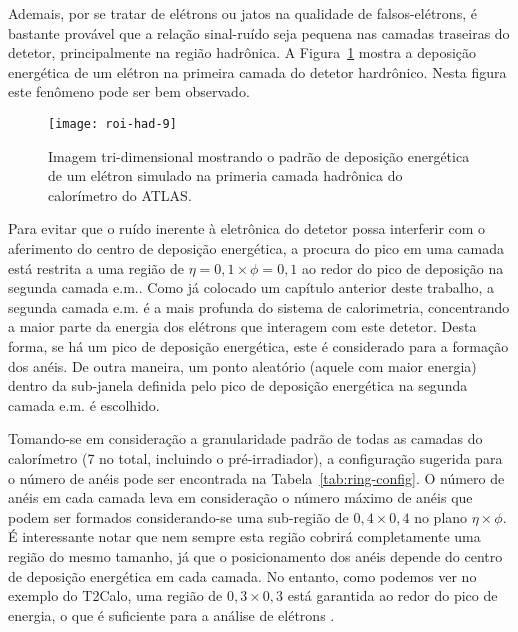 Ademais, por se tratar de elétrons ou jatos na qualidade de falsos-elétrons, é
bastante provável que a relação sinal-ruído seja pequena nas camadas traseiras
do detetor, principalmente na região hadrônica. A Figura~\ref{fig:roi-had-9}
mostra a deposição energética de um elétron na primeira camada do detetor
hardrônico. Nesta figura este fenômeno pode ser bem observado.

\begin{figure}
\begin{center}
\texttt{[image: roi-had-9]}
\end{center}
\caption{Imagem tri-dimensional mostrando o padrão de deposição energética de
um elétron simulado na primeria camada hadrônica do calorímetro do ATLAS.}
\label{fig:roi-had-9}
\end{figure}

Para evitar que o ruído inerente à eletrônica do detetor possa interferir com
o aferimento do centro de deposição energética, a procura do pico em uma
camada está restrita a uma região de $\eta=0,1\times\phi=0,1$ ao redor do pico
de deposição na segunda camada e.m.. Como já colocado um capítulo anterior
deste trabalho, a segunda camada e.m. é a mais profunda do sistema de
calorimetria, concentrando a maior parte da energia dos elétrons que interagem
com este detetor. Desta forma, se há um pico de deposição energética, este é
considerado para a formação dos anéis. De outra maneira, um ponto aleatório
(aquele com maior energia) dentro da sub-janela definida pelo pico de
deposição energética na segunda camada e.m. é escolhido.

Tomando-se em consideração a granularidade padrão de todas as camadas do
calorímetro (7 no total, incluindo o pré-irradiador), a configuração sugerida
para o número de anéis pode ser encontrada na Tabela~\ref{tab:ring-config}. O
número de anéis em cada camada leva em consideração o número máximo de anéis
que podem ser formados considerando-se uma sub-região de $0,4 \times 0,4$ no
plano $\eta\times\phi$. É interessante notar que nem sempre esta região
cobrirá completamente uma região do mesmo tamanho, já que o posicionamento dos
anéis depende do centro de deposição energética em cada camada. No entanto,
como podemos ver no exemplo do T2Calo, uma região de $0,3 \times 0,3$ está
garantida ao redor do pico de energia, o que é suficiente para a análise de
elétrons \cite{daqnote00-02}.

